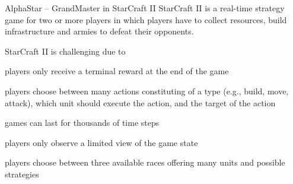 \begin{frame}{AlphaStar -- GrandMaster in StarCraft II}
    StarCraft II is a real-time strategy game for two or more players in which players have to collect resources, build infrastructure and armies to defeat their opponents.


    \pause

    StarCraft II is challenging due to
    \blist
        \item<2->  players only receive a terminal reward at the end of the game
        \item<2->  players choose between many actions constituting of a type (e.g., build, move, attack), which unit should execute the action, and the target of the action
        \item<2->  games can last for thousands of time steps
        \item<3->  players only observe a limited view of the game state
        \item<3->  players choose between three available races offering many units and possible strategies
    \elist
\end{frame}

